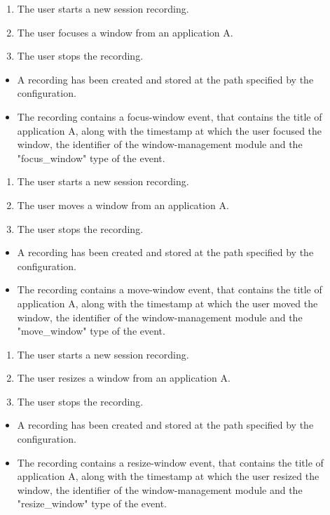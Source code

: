 \begin{tests}
	{\begin{enumerate}
		\item The user starts a new session recording.
		\item The user focuses a window from an application A.
		\item The user stops the recording.
	\end{enumerate}}
	{\begin{itemize}
		\item A recording has been created and stored at the path specified by the configuration.
		\item The recording contains a focus-window event, that contains the title of application A, along with the timestamp at which the user focused the window, the identifier of the window-management module and the "focus_window" type of the event.
	\end{itemize}}
	
	{\begin{enumerate}
		\item The user starts a new session recording.
		\item The user moves a window from an application A.
		\item The user stops the recording.
	\end{enumerate}}
	{\begin{itemize}
		\item A recording has been created and stored at the path specified by the configuration.
		\item The recording contains a move-window event, that contains the title of application A, along with the timestamp at which the user moved the window, the identifier of the window-management module and the "move_window" type of the event.
	\end{itemize}}
	
	{\begin{enumerate}
		\item The user starts a new session recording.
		\item The user resizes a window from an application A.
		\item The user stops the recording.
	\end{enumerate}}
	{\begin{itemize}
		\item A recording has been created and stored at the path specified by the configuration.
		\item The recording contains a resize-window event, that contains the title of application A, along with the timestamp at which the user resized the window, the identifier of the window-management module and the "resize_window" type of the event.
	\end{itemize}}
	

\end{tests}
